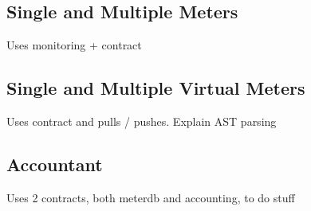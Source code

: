 \subsection{Single and Multiple Meters}
Uses monitoring + contract

\subsection{Single and Multiple Virtual Meters}
Uses contract and pulls / pushes. Explain AST parsing

\subsection{Accountant}
Uses 2 contracts, both meterdb and accounting, to do stuff





